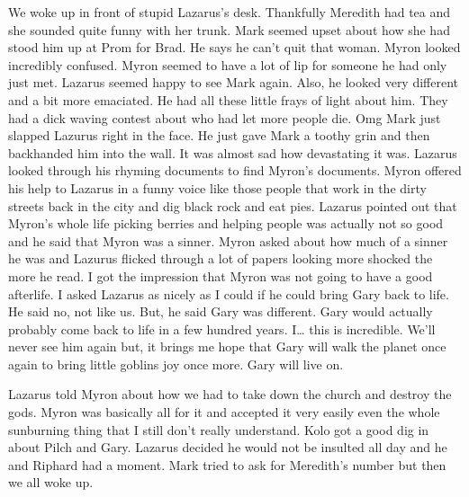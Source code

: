We woke up in front of stupid Lazarus’s desk. Thankfully Meredith had tea and she sounded quite funny with her trunk. Mark seemed upset about how she had stood him up at Prom for Brad. He says he can’t quit that woman. Myron looked incredibly confused. Myron seemed to have a lot of lip for someone he had only just met. Lazarus seemed happy to see Mark again. Also, he looked very different and a bit more emaciated. He had all these little frays of light about him. They had a dick waving contest about who had let more people die. Omg Mark just slapped Lazurus right in the face. He just gave Mark a toothy grin and then backhanded him into the wall. It was almost sad how devastating it was. Lazarus looked through his rhyming documents to find Myron’s documents. Myron offered his help to Lazarus in a funny voice like those people that work in the dirty streets back in the city and dig black rock and eat pies. Lazarus pointed out that Myron’s whole life picking berries and helping people was actually not so good and he said that Myron was a sinner. Myron asked about how much of a sinner he was and Lazurus flicked through a lot of papers looking more shocked the more he read. I got the impression that Myron was not going to have a good afterlife. I asked Lazarus as nicely as I could if he could bring Gary back to life. He said no, not like us. But, he said Gary was different. Gary would actually probably come back to life in a few hundred years. I… this is incredible. We’ll never see him again but, it brings me hope that Gary will walk the planet once again to bring little goblins joy once more. Gary will live on.\medskip

Lazarus told Myron about how we had to take down the church and destroy the gods. Myron was basically all for it and accepted it very easily even the whole sunburning thing that I still don’t really understand. Kolo got a good dig in about Pilch and Gary. Lazarus decided he would not be insulted all day and he and Riphard had a moment. Mark tried to ask for Meredith’s number but then we all woke up.\medskip

